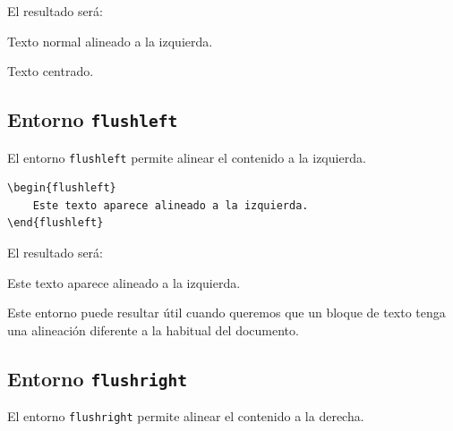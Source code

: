 \documentclass[11pt,a4paper]{article}
\theoremstyle{plain}
\theoremstyle{definition}
\theoremstyle{remark}
\theoremstyle{exercise}
\begin{document}
\noindent El resultado será:

\begin{paginarecuadrada}
Texto normal alineado a la izquierda.

\begin{center}
    Texto centrado.
\end{center}
\end{paginarecuadrada}

%
%
%
%

\subsection{Entorno \texttt{flushleft}}

El entorno \verb|flushleft| permite alinear el contenido a la izquierda.

\begin{lstlisting}
\begin{flushleft}
    Este texto aparece alineado a la izquierda.
\end{flushleft}
\end{lstlisting}

\noindent El resultado será:

\begin{paginarecuadrada}
\begin{flushleft}
    Este texto aparece alineado a la izquierda.
\end{flushleft}
\end{paginarecuadrada}

\noindent Este entorno puede resultar útil cuando queremos que un bloque de texto tenga una alineación diferente a la habitual del documento.

\subsection{Entorno \texttt{flushright}}

El entorno \verb|flushright| permite alinear el contenido
a la derecha.
\end{document}
